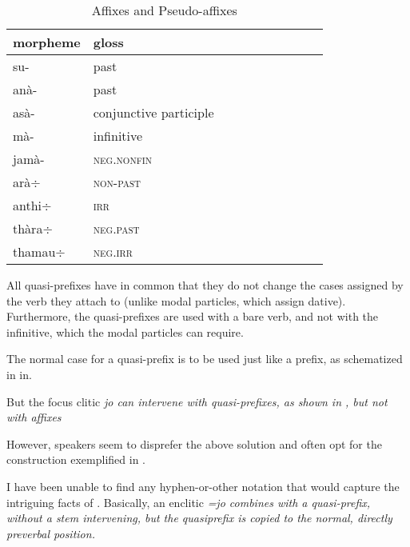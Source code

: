 \begin{table}
	\centering
	\begin{tabular}{llllllllll}
	morpheme	& gloss \\
	\hline
	su- & past \\ 
	anà- & past \\
	asà- & conjunctive participle  \\
	mà- & infinitive  \\
	jamà-&  \textsc{neg.nonfin} \\
	\hline
	arà$\div$ &  \textsc{non-past}  \\
	anthi$\div$&  \textsc{irr} \\
	thàra$\div$ & \textsc{neg.past}   \\
	thamau$\div$&  \textsc{neg.irr} \\
	\hline
	\end{tabular}
	\caption{Affixes and Pseudo-affixes}
	\label{tab:Affixes}
\end{table}

All quasi-prefixes have in common that they do not change the cases assigned by the verb they attach to (unlike modal particles, which assign dative). Furthermore, the quasi-prefixes are used with a bare verb, and not with the infinitive, which the modal particles can require.

The normal case for a quasi-prefix is to be used just like a prefix, as schematized in in.


But the focus clitic \em jo \em can intervene with quasi-prefixes, as shown in , but not with affixes 



However, speakers seem to disprefer the above solution and often opt for the construction exemplified in .



I have been unable to find any hyphen-or-other notation that would capture the intriguing facts of . Basically, an enclitic \em =jo \em combines with a quasi-prefix, without a stem intervening, but the quasiprefix is copied to the normal, directly preverbal position.


